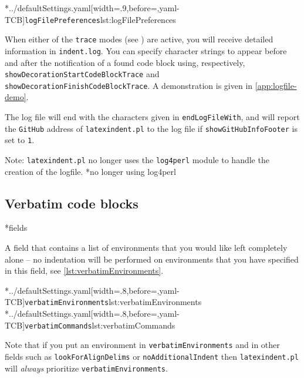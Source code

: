 	\cmhlistingsfromfile[style=logFilePreferences,]*{../defaultSettings.yaml}[width=.9\linewidth,before=\centering,yaml-TCB]{\texttt{logFilePreferences}}{lst:logFilePreferences}

	When%
	 either of the
	\texttt{trace} modes (see ) are active, you will receive
	detailed information in \texttt{indent.log}. You can specify character strings to
	appear before and after the notification of a found code block using, respectively,
	\texttt{showDecorationStartCodeBlockTrace} and \texttt{showDecorationFinishCodeBlockTrace}. A demonstration is given in
	\vref{app:logfile-demo}.

	The log file will end with the characters given in \texttt{endLogFileWith}, and will
	report the \texttt{GitHub} address of \texttt{latexindent.pl} to the log file if
	\texttt{showGitHubInfoFooter} is set to \texttt{1}.

	Note: \texttt{latexindent.pl} no longer uses the \texttt{log4perl} module to handle
	the creation of the logfile.%
	*{no longer using log4perl}

\subsection{Verbatim code blocks}
*{fields}

	A field that contains a list of environments that you would like left completely alone --
	no indentation will be performed on environments that you have specified in this field,
	see \cref{lst:verbatimEnvironments}.

	\begin{cmhtcbraster}[raster column skip=.1\linewidth]
		\cmhlistingsfromfile[style=verbatimEnvironments]*{../defaultSettings.yaml}[width=.8\linewidth,before=\centering,yaml-TCB]{\texttt{verbatimEnvironments}}{lst:verbatimEnvironments}
		\cmhlistingsfromfile[style=verbatimCommands]*{../defaultSettings.yaml}[width=.8\linewidth,before=\centering,yaml-TCB]{\texttt{verbatimCommands}}{lst:verbatimCommands}
	\end{cmhtcbraster}

	Note that if you put an environment in	\texttt{verbatimEnvironments} and in other fields such
	as \texttt{lookForAlignDelims} or \texttt{noAdditionalIndent} then \texttt{latexindent.pl} will
	\emph{always} prioritize  \texttt{verbatimEnvironments}.


